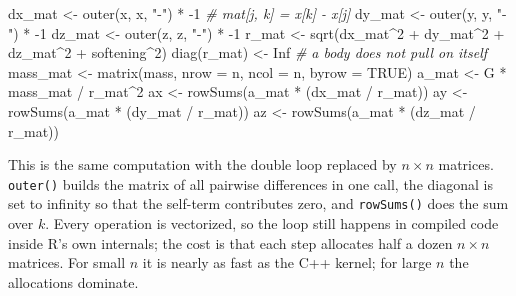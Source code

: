 \documentclass[
  10.5pt,
  letterpaper,
]{scrbook}
\newenvironment{Shaded}{\begin{snugshade}}{\end{snugshade}}
\newcommand{\AttributeTok}[1]{\textcolor[rgb]{0.00,0.00,0.00}{#1}}
\newcommand{\CommentTok}[1]{\textcolor[rgb]{0.00,0.00,0.00}{\textit{#1}}}
\newcommand{\ConstantTok}[1]{\textcolor[rgb]{0.00,0.00,0.00}{#1}}
\newcommand{\DecValTok}[1]{\textcolor[rgb]{0.00,0.00,0.00}{#1}}
\newcommand{\FunctionTok}[1]{\textcolor[rgb]{0.00,0.00,0.00}{#1}}
\newcommand{\NormalTok}[1]{\textcolor[rgb]{0.00,0.00,0.00}{#1}}
\newcommand{\OtherTok}[1]{\textcolor[rgb]{0.00,0.00,0.00}{#1}}
\newcommand{\SpecialCharTok}[1]{\textcolor[rgb]{0.00,0.00,0.00}{#1}}
\newcommand{\StringTok}[1]{\textcolor[rgb]{0.00,0.00,0.00}{#1}}
\theoremstyle{plain}
\theoremstyle{remark}
\begin{document}
\begin{Shaded}
\begin{Highlighting}[]
\NormalTok{dx\_mat }\OtherTok{\textless{}{-}} \FunctionTok{outer}\NormalTok{(x, x, }\StringTok{"{-}"}\NormalTok{) }\SpecialCharTok{*} \SpecialCharTok{{-}}\DecValTok{1}          \CommentTok{\# mat[j, k] = x[k] {-} x[j]}
\NormalTok{dy\_mat }\OtherTok{\textless{}{-}} \FunctionTok{outer}\NormalTok{(y, y, }\StringTok{"{-}"}\NormalTok{) }\SpecialCharTok{*} \SpecialCharTok{{-}}\DecValTok{1}
\NormalTok{dz\_mat }\OtherTok{\textless{}{-}} \FunctionTok{outer}\NormalTok{(z, z, }\StringTok{"{-}"}\NormalTok{) }\SpecialCharTok{*} \SpecialCharTok{{-}}\DecValTok{1}
\NormalTok{r\_mat  }\OtherTok{\textless{}{-}} \FunctionTok{sqrt}\NormalTok{(dx\_mat}\SpecialCharTok{\^{}}\DecValTok{2} \SpecialCharTok{+}\NormalTok{ dy\_mat}\SpecialCharTok{\^{}}\DecValTok{2} \SpecialCharTok{+}\NormalTok{ dz\_mat}\SpecialCharTok{\^{}}\DecValTok{2} \SpecialCharTok{+}\NormalTok{ softening}\SpecialCharTok{\^{}}\DecValTok{2}\NormalTok{)}
\FunctionTok{diag}\NormalTok{(r\_mat) }\OtherTok{\textless{}{-}} \ConstantTok{Inf}                        \CommentTok{\# a body does not pull on itself}
\NormalTok{mass\_mat }\OtherTok{\textless{}{-}} \FunctionTok{matrix}\NormalTok{(mass, }\AttributeTok{nrow =}\NormalTok{ n, }\AttributeTok{ncol =}\NormalTok{ n, }\AttributeTok{byrow =} \ConstantTok{TRUE}\NormalTok{)}
\NormalTok{a\_mat }\OtherTok{\textless{}{-}}\NormalTok{ G }\SpecialCharTok{*}\NormalTok{ mass\_mat }\SpecialCharTok{/}\NormalTok{ r\_mat}\SpecialCharTok{\^{}}\DecValTok{2}
\NormalTok{ax }\OtherTok{\textless{}{-}} \FunctionTok{rowSums}\NormalTok{(a\_mat }\SpecialCharTok{*}\NormalTok{ (dx\_mat }\SpecialCharTok{/}\NormalTok{ r\_mat))}
\NormalTok{ay }\OtherTok{\textless{}{-}} \FunctionTok{rowSums}\NormalTok{(a\_mat }\SpecialCharTok{*}\NormalTok{ (dy\_mat }\SpecialCharTok{/}\NormalTok{ r\_mat))}
\NormalTok{az }\OtherTok{\textless{}{-}} \FunctionTok{rowSums}\NormalTok{(a\_mat }\SpecialCharTok{*}\NormalTok{ (dz\_mat }\SpecialCharTok{/}\NormalTok{ r\_mat))}
\end{Highlighting}
\end{Shaded}

This is the same computation with the double loop replaced by
\(n \times n\) matrices. \texttt{outer()} builds the matrix of all
pairwise differences in one call, the diagonal is set to infinity so
that the self-term contributes zero, and \texttt{rowSums()} does the sum
over \(k\). Every operation is vectorized, so the loop still happens in
compiled code inside R's own internals; the cost is that each step
allocates half a dozen \(n\times n\) matrices. For small \(n\) it is
nearly as fast as the C++ kernel; for large \(n\) the allocations
dominate.
\end{document}
